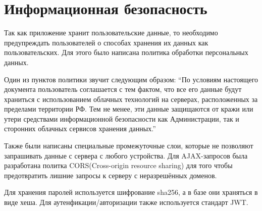 \section{Информационная безопасность}

Так как приложение хранит пользовательские данные, то необходимо предупреждать пользователей о способах хранения
их данных как пользовательских. Для этого было написана политика обработки персональных данных.

Один из пунктов политики звучит следующим образом: ``По условиям настоящего документа пользователь соглашается с тем фактом, что все его данные будут храниться с использованием облачных технологий на серверах, расположенных за пределами территории РФ.
Тем не менее, эти данные защищаются от кражи или утери средствами информационной безопасности как Администрации, так и сторонних облачных сервисов хранения данных.''

Также были написаны специальные промежуточные слои, которые не позволяют запрашивать данные с сервера с любого устройства.
Для AJAX-запросов была разработана политка CORS(Cross-origin resource sharing) для того чтобы предотвратить лишние запросы к серверу с неразрешённых доменов.

Для хранения паролей используется шифрование sha256, а в базе они храняться в виде хеша. Для аутенфикации/авторизации также используется стандарт JWT.